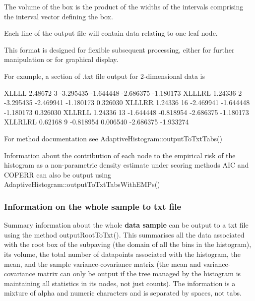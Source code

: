\-The volume of the box is the product of the widths of the intervals comprising the interval vector defining the box.

\-Each line of the output file will contain data relating to one leaf node.

\-This format is designed for flexible subsequent processing, either for further manipulation or for graphical display.

\-For example, a section of .txt file output for 2-\/dimensional data is

\begin{DoxyVerb}
XLLLL   2.48672 3    -3.295435   -1.644448   -2.686375   -1.180173
XLLLRL  1.24336 2    -3.295435   -2.469941   -1.180173    0.326030
XLLLRR  1.24336 16   -2.469941   -1.644448   -1.180173    0.326030
XLLRLL  1.24336 13   -1.644448   -0.818954   -2.686375   -1.180173
XLLRLRL 0.62168 9    -0.818954    0.006540   -2.686375   -1.933274
\end{DoxyVerb}


\-For method documentation see \-Adaptive\-Histogram\-::output\-To\-Txt\-Tabs()

\-Information about the contribution of each node to the empirical risk of the histogram as a non-\/parametric density estimate under scoring methods \-A\-I\-C and \-C\-O\-P\-E\-R\-R can also be output using \-Adaptive\-Histogram\-::output\-To\-Txt\-Tabs\-With\-E\-M\-Ps()\hypertarget{AdaptiveHistograms_adhsubsec_outputroot}{}\subsubsection{\-Information on the whole sample to txt file}\label{AdaptiveHistograms_adhsubsec_outputroot}
\-Summary information about the whole {\bfseries  data sample } can be output to a txt file using the method output\-Root\-To\-Txt(). \-This summarises all the data associated with the root box of the subpaving (the domain of all the bins in the histogram), its volume, the total number of datapoints associated with the histogram, the mean, and the sample variance-\/covariance matrix (the mean and variance-\/covariance matrix can only be output if the tree managed by the histogram is maintaining all statistics in its nodes, not just counts). \-The information is a mixture of alpha and numeric characters and is separated by spaces, not tabs.

